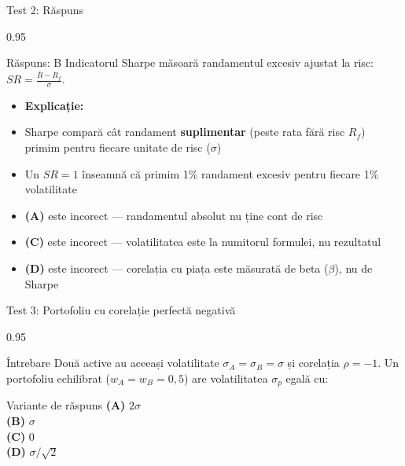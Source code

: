 \documentclass[9pt, aspectratio=169, t]{beamer}
\begin{document}
\begin{frame}[shrink=10]{Test 2: Răspuns}
\begin{cminipage}{0.95\textwidth}
    \begin{exampleblock}{Răspuns: B}
        Indicatorul Sharpe măsoară randamentul excesiv ajustat la risc: $SR = \frac{\bar{R} - R_f}{\sigma}$.
    \end{exampleblock}
    \vspace{0.2cm}
    \begin{itemize}\setlength{\itemsep}{0pt}
        \item \textbf{Explicație:}
        \item Sharpe compară cât randament \textbf{suplimentar} (peste rata fără risc $R_f$) primim pentru fiecare unitate de risc ($\sigma$)
        \item Un $SR = 1$ înseamnă că primim 1\% randament excesiv pentru fiecare 1\% volatilitate
        \item \textbf{(A)} este incorect --- randamentul absolut nu ține cont de risc
        \item \textbf{(C)} este incorect --- volatilitatea este la numitorul formulei, nu rezultatul
        \item \textbf{(D)} este incorect --- corelația cu piața este măsurată de beta ($\beta$), nu de Sharpe
    \end{itemize}
\end{cminipage}
\end{frame}

\begin{frame}[shrink=10]{Test 3: Portofoliu cu corelație perfectă negativă}
\begin{cminipage}{0.95\textwidth}
    \begin{alertblock}{Întrebare}
        Două active au aceeași volatilitate $\sigma_A = \sigma_B = \sigma$ și corelația $\rho = -1$.
        Un portofoliu echilibrat ($w_A = w_B = 0{,}5$) are volatilitatea $\sigma_p$ egală cu:
    \end{alertblock}

    \vspace{0.5cm}
    \begin{block}{Variante de răspuns}
    \textcolor{MainBlue}{\textbf{(A)}} $2\sigma$\\[3pt]
    \textcolor{MainBlue}{\textbf{(B)}} $\sigma$\\[3pt]
    \textcolor{MainBlue}{\textbf{(C)}} $0$\\[3pt]
    \textcolor{MainBlue}{\textbf{(D)}} $\sigma / \sqrt{2}$
    \end{block}
\end{cminipage}
\end{frame}
\end{document}

